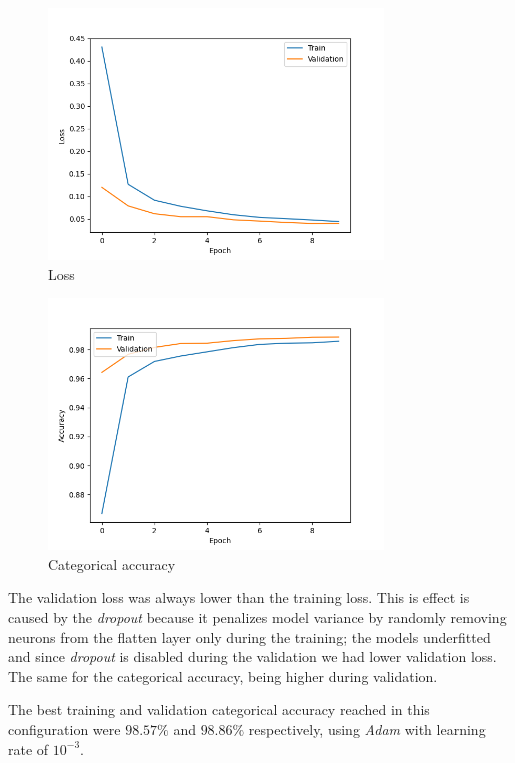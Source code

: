 \documentclass[compsoc]{IEEEtran}
\begin{document}
\begin{figure}[ht!]
\centering                                                                        
\includegraphics[width=3.5in]{loss.png}
\captionsetup{justification=centering}                                                                                         
\caption{Loss}
\label{fig:loss}                                                                                                                               
\end{figure}


\begin{figure}[ht!]
\centering                                                                        
\includegraphics[width=3.5in]{acc.png}
\captionsetup{justification=centering}                                                                                         
\caption{Categorical accuracy}
\label{fig:acc}                                                                                                                               
\end{figure}


The validation loss was always lower than the training loss. This is effect is caused by the \emph{dropout} because it penalizes model variance by randomly removing neurons from the flatten layer only during the training; the models underfitted and since \emph{dropout} is disabled during the validation we had lower validation loss. The same for the categorical accuracy, being higher during validation.\par
The best training and validation categorical accuracy reached in this configuration were $98.57\%$ and $98.86\%$ respectively, using \emph{Adam} with learning rate of $10^{-3}$.
\end{document}
